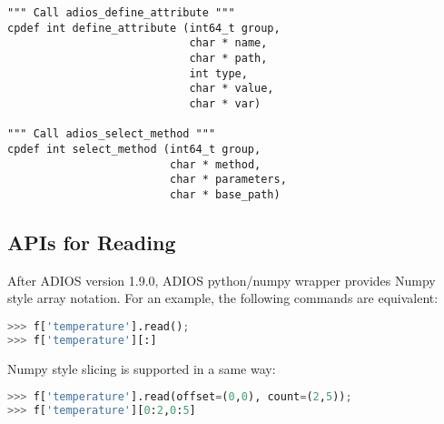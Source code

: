 \begin{lstlisting}[language=cython,caption={Functions for writing and No-XML},label={},]
""" Call adios_define_attribute """
cpdef int define_attribute (int64_t group,
                            char * name,
                            char * path,
                            int type,
                            char * value,
                            char * var)

""" Call adios_select_method """
cpdef int select_method (int64_t group,
                         char * method,
                         char * parameters,
                         char * base_path)
\end{lstlisting}

\subsection{APIs for Reading}
After ADIOS version 1.9.0, ADIOS python/numpy wrapper provides Numpy style array notation. For an example, the following commands are equivalent:
\begin{lstlisting}[language=Python,caption={Numpy style reading},label={},]
>>> f['temperature'].read(); 
>>> f['temperature'][:]
\end{lstlisting}

Numpy style slicing is supported in a same way:
\begin{lstlisting}[language=Python,caption={Numpy style slicing},label={},]
>>> f['temperature'].read(offset=(0,0), count=(2,5)); 
>>> f['temperature'][0:2,0:5]
\end{lstlisting}

